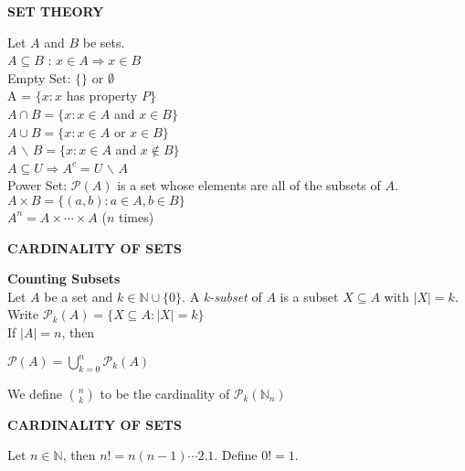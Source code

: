 \documentclass[a4paper]{article}
\begin{document}
\begin{multicols}{2}
\begin{framed}
	\begin{center}
		\textbf{\textsc{SET THEORY}}
	\end{center}
	Let $A$ and $B$ be sets.\\
	$A \subseteq B$ : $x \in A \Rightarrow x \in B$\\
	Empty Set: $\{\}$ or $\emptyset$\\
	A = $\{x: x$ has property $P\}$\\
	$A \cap B = \{x: x \in A $ and $x \in B\}$\\
	$A \cup B = \{x: x \in A $ or $x \in B\}$\\
	$A$ $\backslash$ $ B = \{x: x \in A $ and $x \notin B\}$\\
	$A \subseteq U \Rightarrow A^c = U$ $\backslash$ $A$\\
	Power Set: $\mathcal{P}(A)$ is a set whose elements are all of the subsets of $A$.\\
	$A \times B = \{(a, b) : a \in A, b \in B\}$\\
	$A^n = A \times \cdots \times A$ ($n$ times)
\end{framed}

\begin{framed}
	\begin{center}
		\textbf{\textsc{CARDINALITY OF SETS}}
	\end{center}
	
	\noindent
	\textbf{Counting Subsets}\\
	Let $A$ be a set and $k \in \mathbb{N} \cup \{0\}$.
	A \textit{k-subset} of $A$ is a subset $X \subseteq A$ with $\vert X \vert = k$.\\
	
	\noindent
	Write $\mathcal{P}_k(A) = \{X \subseteq A : \vert X \vert = k \}$\\
	
	\noindent
	If $\vert A \vert = n$, then
	\begin{center}
		$\mathcal{P}(A) = \bigcup\limits^n_{k=0}\mathcal{P}_k(A)$
	\end{center}
	
	\noindent
	We define $\binom{n}{k}$ to be the cardinality of $\mathcal{P}_k(\mathbb{N}_n)$
\end{framed}

\begin{framed}
	\begin{center}
		\textbf{\textsc{CARDINALITY OF SETS}}
	\end{center}
	Let $n \in \mathbb{N}$, then $n! = n(n-1)\cdots 2.1.$ Define $0! = 1$.\\
	

\end{framed}
\end{multicols}
\end{document}
